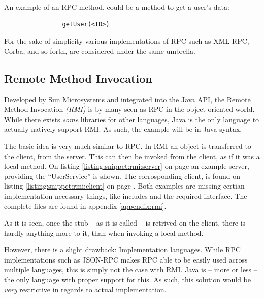 			An example of an RPC method, could be a method to get a user's data:
			\begin{verbatim}
				getUser(<ID>)
			\end{verbatim}

			For the sake of simplicity various implementations of RPC such as XML-RPC, Corba, and so forth, are considered under the same umbrella.
		
		\subsection{Remote Method Invocation}
			Developed by Sun Microsystems and integrated into the Java API\cite{Downing:1998:JRR:522413}, the Remote Method Invocation \emph{(RMI)} is by many seen as RPC in the object oriented world. While there exists \emph{some} libraries for other languages, Java is the only language to actually natively support RMI. As such, the example will be in Java syntax.

			The basic idea is very much similar to RPC. In RMI an object is transferred to the client, from the server. This can then be invoked from the client, as if it was a local method. On listing \ref{listing:snippet:rmi:server} on page \pageref{listing:snippet:rmi:server} an example server, providing the ``UserService'' is shown. The corrosponding client, is found on listing \ref{listing:snippet:rmi:client} on page \pageref{listing:snippet:rmi:client}. Both examples are missing certian implementation necessary things, like includes and the required interface. The complete files are found in appendix \ref{appendix:rmi}.

			As it is seen, once the stub -- as it is called -- is retrived on the client, there is hardly anything more to it, than when invoking a local method.

			

			

			However, there is a slight drawback: Implementation languages. While RPC implementations such as JSON-RPC makes RPC able to be easily used across multiple languages, this is simply not the case with RMI. Java is -- more or less -- the only language with proper support for this. As such, this solution would be \emph{very} restrictive in regards to actual implementation.

